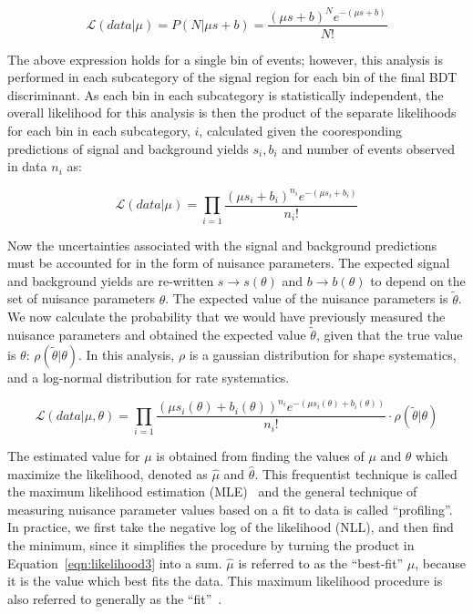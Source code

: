 \begin{equation}
\label{eqn:likelihood1}
\mathcal{L}(data|\mu) = P(N|\mu s+b) = \frac{(\mu s+b)^{N}e^{-(\mu s+b)}}{N!}
\end{equation}

\noindent The above expression holds for a single bin of events; however, this analysis is performed in each subcategory of the signal
region for each bin of the final BDT discriminant.
As each bin in each subcategory is statistically independent, the overall likelihood for this analysis is then the product of the
separate likelihoods for each bin in each subcategory, $i$,
calculated given the cooresponding predictions of signal and background yields $s_{i}, b_{i}$ and number of events observed in data $n_{i}$ as:

\begin{equation}
\label{eqn:likelihood2}
\mathcal{L}(data|\mu) = \prod_{i=1} \frac{(\mu s_{i}+b_{i})^{n_{i}}e^{-(\mu s_{i}+b_{i})}}{n_{i}!}
\end{equation}

\noindent Now the uncertainties associated with the signal and background predictions must be accounted for in the form of nuisance parameters. The expected signal
and background yields are re-written $s \rightarrow s(\theta)$ and $b \rightarrow b(\theta)$ to depend on the set of nuisance parameters $\theta$.
The expected value of the nuisance parameters is $\tilde{\theta}$.
We now calculate the probability that we would have previously measured the nuisance parameters and obtained the expected value $\tilde{\theta}$, given that the
true value is $\theta$: $\rho(\tilde{\theta}|\theta)$. In this analysis, $\rho$ is a gaussian distribution for shape systematics,
and a log-normal distribution for rate systematics.

\begin{equation}
\label{eqn:likelihood3}
\mathcal{L}(data|\mu,\theta) = \prod_{i=1} \frac{(\mu s_{i}(\theta)+b_{i}(\theta))^{n_{i}}e^{-(\mu s_{i}(\theta)+b_{i}(\theta))}}{n_{i}!} \cdot \rho(\tilde{\theta}|\theta)
\end{equation}

\noindent The estimated value for $\mu$ is obtained from finding the values of $\mu$ and $\theta$ which maximize the likelihood, denoted as $\hat{\mu}$ and $\hat{\theta}$.
This frequentist technique is called the maximum likelihood estimation (MLE)~\cite{lista} and the general technique of measuring nuisance parameter values based on a fit
to data is called ``profiling''.
In practice, we first take the negative log of the likelihood (NLL), and then find the minimum, since it simplifies
the procedure by turning the product in Equation~\ref{eqn:likelihood3} into a sum. $\hat{\mu}$ is referred to as the ``best-fit'' $\mu$, because it is the value which best fits the data.
This maximum likelihood procedure is also referred to generally as the ``fit''~\cite{CMS-AN-11-298}. 

